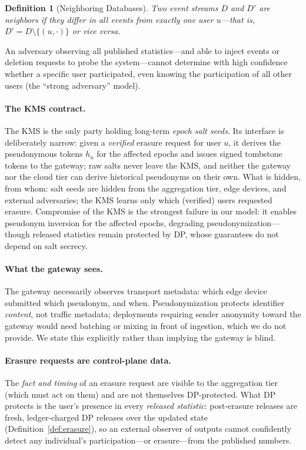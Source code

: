 \documentclass[sigconf,anonymous,review]{acmart}
\newtheorem{definition}[theorem]{Definition}
\begin{document}
\begin{definition}[Neighboring Databases]
    Two event streams $D$ and $D'$ are neighbors if they differ in all events from exactly one user $u$---that is, $D' = D \setminus \{(u, \cdot)\}$ or vice versa.
\end{definition}

An adversary observing all published statistics---and able to inject events or deletion requests to probe the system---cannot determine with high confidence whether a specific user participated, even knowing the participation of all other users (the ``strong adversary'' model).

\paragraph{The KMS contract.} The KMS is the only party holding long-term \emph{epoch salt seeds}. Its interface is deliberately narrow: given a \emph{verified} erasure request for user $u$, it derives the pseudonymous tokens $h_u$ for the affected epochs and issues signed tombstone tokens to the gateway; raw salts never leave the KMS, and neither the gateway nor the cloud tier can derive historical pseudonyms on their own. What is hidden, from whom: salt seeds are hidden from the aggregation tier, edge devices, and external adversaries; the KMS learns only which (verified) users requested erasure. Compromise of the KMS is the strongest failure in our model: it enables pseudonym inversion for the affected epochs, degrading pseudonymization---though released statistics remain protected by DP, whose guarantees do not depend on salt secrecy.

\paragraph{What the gateway sees.} The gateway necessarily observes transport metadata: which edge device submitted which pseudonym, and when. Pseudonymization protects identifier \emph{content}, not traffic metadata; deployments requiring sender anonymity toward the gateway would need batching or mixing in front of ingestion, which we do not provide. We state this explicitly rather than implying the gateway is blind.

\paragraph{Erasure requests are control-plane data.} The \emph{fact and timing} of an erasure request are visible to the aggregation tier (which must act on them) and are not themselves DP-protected. What DP protects is the user's presence in every \emph{released statistic}: post-erasure releases are fresh, ledger-charged DP releases over the updated state (Definition~\ref{def:erasure}), so an external observer of outputs cannot confidently detect any individual's participation---or erasure---from the published numbers.
\end{document}

